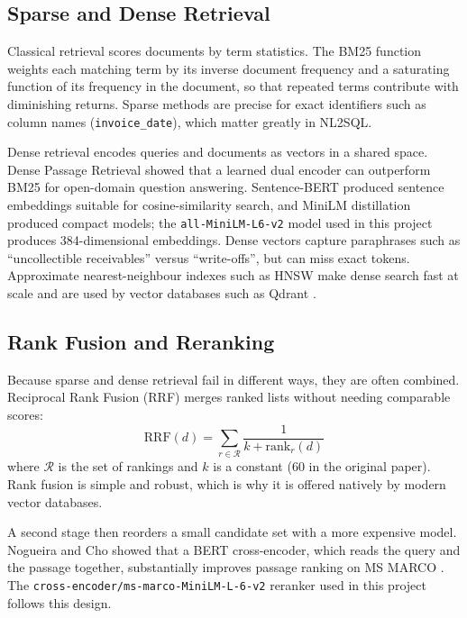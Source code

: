 \subsection{Sparse and Dense Retrieval}
Classical retrieval scores documents by term statistics. The BM25 function
\cite{robertson2009bm25} weights each matching term by its inverse document frequency and a
saturating function of its frequency in the document, so that repeated terms contribute
with diminishing returns. Sparse methods are precise for exact identifiers such as column
names (\texttt{invoice\_date}), which matter greatly in NL2SQL.

Dense retrieval encodes queries and documents as vectors in a shared space. Dense Passage
Retrieval \cite{karpukhin2020dpr} showed that a learned dual encoder can outperform BM25 for
open-domain question answering. Sentence-BERT \cite{reimers2019sbert} produced sentence
embeddings suitable for cosine-similarity search, and MiniLM \cite{wang2020minilm}
distillation produced compact models; the \texttt{all-MiniLM-L6-v2} model used in this
project produces 384-dimensional embeddings. Dense vectors capture paraphrases such as
``uncollectible receivables'' versus ``write-offs'', but can miss exact tokens. Approximate
nearest-neighbour indexes such as HNSW \cite{malkov2018hnsw} make dense search fast at scale
and are used by vector databases such as Qdrant \cite{qdrantdocs}.

\subsection{Rank Fusion and Reranking}
Because sparse and dense retrieval fail in different ways, they are often combined.
Reciprocal Rank Fusion (RRF) \cite{cormack2009rrf} merges ranked lists without needing
comparable scores:
\begin{equation}
    \text{RRF}(d) = \sum_{r \in \mathcal{R}} \frac{1}{k + \text{rank}_r(d)}
\end{equation}
where $\mathcal{R}$ is the set of rankings and $k$ is a constant (60 in the original
paper). Rank fusion is simple and robust, which is why it is offered natively by modern
vector databases.

A second stage then reorders a small candidate set with a more expensive model. Nogueira
and Cho \cite{nogueira2019passage} showed that a BERT cross-encoder, which reads the query
and the passage together, substantially improves passage ranking on MS MARCO
\cite{bajaj2016msmarco}. The \texttt{cross-encoder/ms-marco-MiniLM-L-6-v2} reranker used in
this project follows this design.

